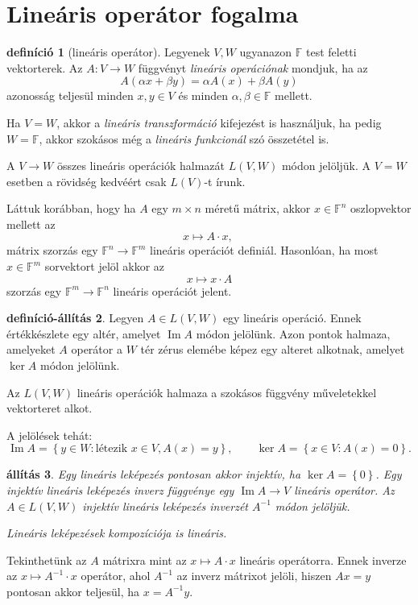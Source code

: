\documentclass[9pt, a4paper, showtrims]{memoir}
\theoremstyle{plain}
\newtheorem{proposition}{állítás}[chapter]
\theoremstyle{remark}
\theoremstyle{definition}
\newtheorem{definition}[proposition]{definíció}
\newtheorem{defprop}[proposition]{definíció-állítás}
\DeclareMathOperator{\im}{Im}
\begin{document}
\section{Lineáris operátor fogalma}
\begin{definition}[lineáris operátor]
	Legyenek $V,W$ ugyanazon $\mathbb{F}$ test feletti vektorterek.
	Az $A:V\to W$ függvényt \emph{lineáris operációnak} mondjuk,
	ha az
	\begin{displaymath}
		A\left( \alpha x+\beta y \right)=
		\alpha A\left( x \right)+\beta A\left( y \right)
	\end{displaymath}
	azonosság teljesül minden $x,y\in V$ és minden $\alpha,\beta\in\mathbb{F}$ mellett.

	Ha $V=W$, akkor a \emph{lineáris transzformáció} kifejezést is használjuk,
	ha pedig $W=\mathbb{F}$,
	akkor szokásos még a \emph{lineáris funkcionál} szó összetétel is.

	A $V\to W$ összes lineáris operációk halmazát $L\left( V,W \right)$ módon jelöljük.
	A $V=W$ esetben a rövidség kedvéért csak $L\left( V \right)$-t írunk.
\end{definition}
Láttuk korábban, hogy ha $A$ egy $m\times n$ méretű mátrix,
akkor $x\in\mathbb{F}^n$ oszlopvektor mellett az
\[
	x\mapsto A\cdot x,\
\]
mátrix szorzás egy $\mathbb{F}^n\to\mathbb{F}^m$ lineáris operációt definiál.
Hasonlóan,
ha most $x\in\mathbb{F}^m$ sorvektort jelöl akkor az
\[
	x\mapsto x\cdot A
\]
szorzás egy $\mathbb{F}^m\to\mathbb{F}^n$ lineáris operációt jelent.

\begin{defprop}
	Legyen $A\in L\left( V,W \right)$ egy lineáris operáció.
	Ennek értékkészlete egy altér,
	amelyet $\im A$ módon jelölünk.
	Azon pontok halmaza,
	amelyeket $A$ operátor a $W$ tér zérus elemébe képez egy alteret alkotnak,
	amelyet $\ker A$ módon jelölünk.

	Az $L\left( V,W \right)$ lineáris operációk halmaza a szokásos függvény műveletekkel vektorteret alkot.
\end{defprop}
A jelölések tehát:
\[
	\im A=\left\{ y\in W:\text{létezik } x\in V, A(x)=y \right\},
	\qquad
	\ker A=
	\left\{ x\in V:A\left( x \right)=0 \right\}.
\]
\begin{proposition}
	Egy lineáris leképezés pontosan akkor injektív, ha $\ker A=\left\{ 0 \right\}$.
	Egy injektív lineáris leképezés inverz függvénye egy $\im A\to V$ lineáris operátor.
	Az $A\in L\left( V,W \right)$ injektív lineáris leképezés inverzét $A^{-1}$ módon jelöljük.

	Lineáris leképezések kompozíciója is lineáris.
\end{proposition}
Tekinthetünk az $A$ mátrixra mint az $x\mapsto A\cdot x$ lineáris operátorra.
Ennek inverze az $x\mapsto A^{-1}\cdot x$ operátor,
ahol $A^{-1}$ az inverz mátrixot jelöli, hiszen
$Ax=y$ pontosan akkor teljesül, ha $x=A^{-1}y$.
\end{document}
